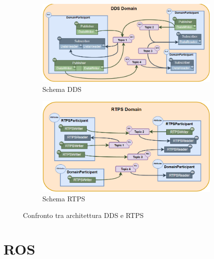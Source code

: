 \begin{figure}[H]
    \centering
    \begin{subfigure}{0.45\linewidth}
      \centering
      \includegraphics[width=\linewidth]{./img/dds_architecture.png}
      \caption{Schema DDS}\label{fig:dds}
    \end{subfigure}
    \begin{subfigure}{0.45\linewidth}
      \centering
      \includegraphics[width=\linewidth]{./img/rtps_architecture.png}
      \caption{Schema RTPS}\label{fig:rtps}
    \end{subfigure}
    \caption{Confronto tra architettura DDS e RTPS}\label{fig:confrontodds_rtps}
  \end{figure}


\section{ROS}\label{SSEC:rosiface}


